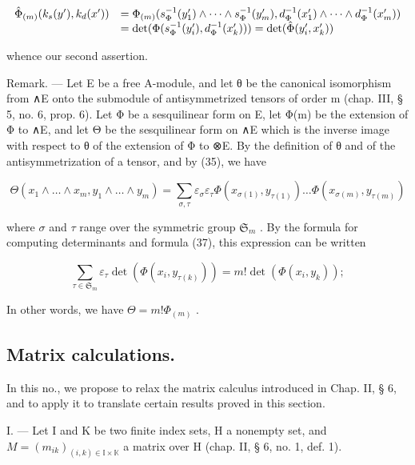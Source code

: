 \[
\begin{array}{r l} \hat {\Phi} _ {(m)} (k _ {s} (y ^ {\prime}), k _ {d} (x ^ {\prime})) & = \Phi_ {(m)} (s _ {\Phi} ^ {- 1} (y _ {1} ^ {\prime}) \wedge \dots \wedge s _ {\Phi} ^ {- 1} (y _ {m} ^ {\prime}), d _ {\Phi} ^ {- 1} (x _ {1} ^ {\prime}) \wedge \dots \wedge d _ {\Phi} ^ {- 1} (x _ {m} ^ {\prime})) \\ & = \det (\Phi (s _ {\Phi} ^ {- 1} (y _ {i} ^ {\prime}), d _ {\Phi} ^ {- 1} (x _ {k} ^ {\prime}))) = \det (\hat {\Phi} (y _ {i} ^ {\prime}, x _ {k} ^ {\prime})) \end{array}
\]

whence our second assertion.

Remark. --- Let E be a free A-module, and let θ be the canonical isomorphism from ∧E onto the submodule of antisymmetrized tensors of order m (chap. III, § 5, no. 6, prop. 6). Let Φ be a sesquilinear form on E, let Φ(m) be the extension of Φ to ∧E, and let Θ be the sesquilinear form on ∧E which is the inverse image with respect to θ of the extension of Φ to ⊗E. By the definition of θ and of the antisymmetrization of a tensor, and by (35), we have

\[
\Theta (x _ {1} \wedge \dots \wedge x _ {m}, y _ {1} \wedge \dots \wedge y _ {m}) = \sum_ {\sigma , \tau} \varepsilon_ {\sigma} \varepsilon_ {\tau} \Phi (x _ {\sigma (1)}, y _ {\tau (1)}) \dots \Phi (x _ {\sigma (m)}, y _ {\tau (m)})
\]

where \(\sigma\) and \(\tau\) range over the symmetric group \(\mathfrak{S}_{m}\) . By the formula for computing determinants and formula (37), this expression can be written

\[
\sum_ {\tau \in \mathfrak {S} _ {m}} \varepsilon_ {\tau} \det (\Phi (x _ {i}, y _ {\tau (k)})) = m! \det (\Phi (x _ {i}, y _ {k}));
\]

In other words, we have \(\Theta = m!\Phi_{(m)}\) .

\subsection{Matrix calculations.}

In this no., we propose to relax the matrix calculus introduced in Chap. II, § 6, and to apply it to translate certain results proved in this section.

I. --- Let I and K be two finite index sets, H a nonempty set, and \(M = (m_{ik})_{(i,k) \in \mathbb{I} \times \mathbb{K}}\) a matrix over H (chap. II, § 6, no. 1, def. 1).

